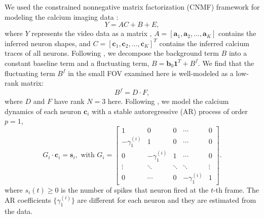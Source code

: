 \documentclass[10pt,letterpaper]{article}
\begin{document}
{We used the constrained nonnegative matrix factorization (CNMF) framework \citep{Pnevmatikakis2016,Zhou2018} for modeling the calcium imaging data : 
\begin{equation}
	Y = AC+B +E, \label{eq:cnmf}
\end{equation}
where $Y$ represents the video data as a matrix \citep{Pnevmatikakis2016}, $A=[\bm{a}_1, \bm{a}_2, \hdots, \bm{a}_K]$ contains the inferred neuron shapes, and $C=[\bm{c}_1, \bm{c}_2, \hdots, \bm{c}_K]^T$ contains the inferred calcium traces of all neurons.  Following \citep{Zhou2018}, we decompose the background term $B$ into a constant baseline term and a fluctuating term, $B = \bm{b}_0 \bm{1}^T + B^f$. We find that the fluctuating term $B^f$ in the small FOV examined here is well-modeled as a low-rank matrix:
\begin{equation}
 	B^f = D\cdot F, \label{eq:bg}
 \end{equation} 
where $D$ and $F$ have rank $N = 3$ here. Following \citep{Vogelstein2010,Pnevmatikakis2016,Friedrich2017a,Zhou2018}, we model the calcium dynamics of each neuron $\bm{c}_i$ with a stable autoregressive (AR) process of order $p=1$,
\begin{equation}
  G_i\cdot\bm{c}_i = \bm{s}_i, \text{ with } G_i=\begin{bmatrix}
   1 &  0& 0 & \cdots &0 \\ 
 -\gamma_1^{(i)}& 1 & 0 & \cdots  & 0\\ 
  0& -\gamma_1^{(i)} &1  &  \cdots& 0\\ 
 \vdots  &  \ddots & \ddots &\ddots &\vdots \\ 
  0& \cdots &  0&  -\gamma_1^{(i)}&1 
\end{bmatrix}.
\label{eq:ar2}
\end{equation}
where $s_i(t)\geq 0$ is the number of spikes that neuron fired at the $t$-th frame.  The AR coefficients $\{\gamma_1^{(i)}\}$ are different for each neuron and they are estimated from the data. 


}
\end{document}
